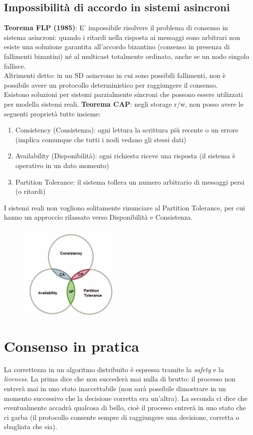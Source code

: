 \documentclass[12pt,italian]{report}
\begin{document}
\subsection{Impossibilità di accordo in sistemi asincroni}
\noindent \textbf{Teorema FLP (1985)}: E' impossibile risolvere il problema di consenso in sistema asincroni: quando i ritardi nella risposta ai messaggi sono arbitrari non esiste una soluzione garantita all'accordo bizantino (consenso in presenza di fallimenti bizantini) né al multicast totalmente ordinato, anche se un nodo singolo fallisce. \\  Altrimenti detto: in un SD asincrono in cui sono possibili fallimenti, non è possibile avere un protocollo deterministico per raggiungere il consenso. \\ Esistono soluzioni per sistemi parzialmente sincroni che possono essere utilizzati per modella sistemi reali. 
\bigbreak
\noindent \textbf{Teorema CAP}: negli storage r/w, non posso avere le seguenti proprietà tutte insieme:
\begin{enumerate}
    \item Consistency (Consistenza): ogni lettura la scrittura più recente o un errore (implica comunque che tutti i nodi vedano gli stessi dati)
    \item Availability (Disponibilità): ogni richiesta riceve una risposta (il sistema è operativo in un dato momento)
    \item Partition Tolerance: il sistema tollera un numero arbitrario di messaggi persi (o ritardi)
\end{enumerate}
I sistemi reali non vogliono solitamente rinunciare al Partition Tolerance, per cui hanno un approccio rilassato verso Disponibilità e Consistenza. 
\begin{figure}[h]
\centering
\includegraphics[width=50mm]{img/cap.png}
\end{figure}

\section{Consenso in pratica}
La correttezza in un algoritmo distribuito è espressa tramite la \textit{safety} e la \textit{liveness}. La prima dice che non succederà mai nulla di brutto: il processo non entrerà mai in uno stato inaccettabile (non sarà possibile dimostrare in un momento successivo che la decisione corretta era un'altra). La seconda ci dice che eventualmente accadrà qualcosa di bello, cioè il processo entrerà in uno stato che ci garba (il protocollo consente sempre di raggiungere una decisione, corretta o sbagliata che sia).
\end{document}
